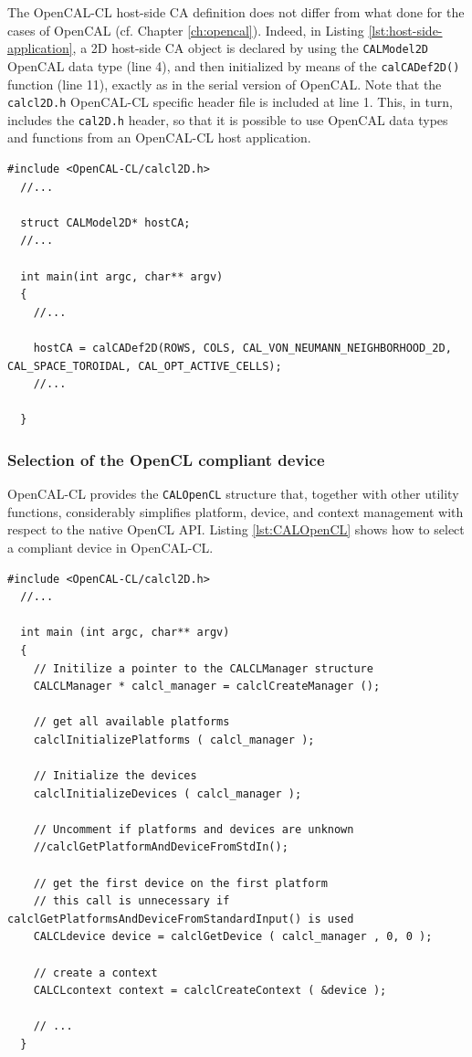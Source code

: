 The OpenCAL-CL host-side CA definition does not differ from what done
for the cases of OpenCAL (cf. Chapter \ref{ch:opencal}). Indeed, in
Listing \ref{lst:host-side-application}, a 2D host-side CA object is
declared by using the \verb'CALModel2D' OpenCAL data type (line 4),
and then initialized by means of the \verb'calCADef2D()' function
(line 11), exactly as in the serial version of OpenCAL. Note that the
\verb'calcl2D.h' OpenCAL-CL specific header file is included at line
1. This, in turn, includes the \verb'cal2D.h' header, so that it is
possible to use OpenCAL data types and functions from an OpenCAL-CL
host application.

\begin{lstlisting}[float,floatplacement=H, label=lst:host-side-application, caption={An example of OpenCAL-CL host-side application.}]
  #include <OpenCAL-CL/calcl2D.h>
  //...

  struct CALModel2D* hostCA;
  //...

  int main(int argc, char** argv)
  {
    //...

    hostCA = calCADef2D(ROWS, COLS, CAL_VON_NEUMANN_NEIGHBORHOOD_2D, CAL_SPACE_TOROIDAL, CAL_OPT_ACTIVE_CELLS);
    //...

  }
\end{lstlisting}


\subsubsection{Selection of the OpenCL compliant device}

OpenCAL-CL provides the \verb'CALOpenCL' structure that, together with
other utility functions, considerably simplifies platform, device, and
context management with respect to the native OpenCL API. Listing
\ref{lst:CALOpenCL} shows how to select a compliant device in
OpenCAL-CL.

\begin{lstlisting}[float,floatplacement=H, label=lst:CALOpenCL, caption=Access to platform and devices.]
  #include <OpenCAL-CL/calcl2D.h>
  //...

  int main (int argc, char** argv)
  {
    // Initilize a pointer to the CALCLManager structure
    CALCLManager * calcl_manager = calclCreateManager ();

    // get all available platforms
    calclInitializePlatforms ( calcl_manager );

    // Initialize the devices
    calclInitializeDevices ( calcl_manager );

    // Uncomment if platforms and devices are unknown
    //calclGetPlatformAndDeviceFromStdIn();

    // get the first device on the first platform
    // this call is unnecessary if calclGetPlatformsAndDeviceFromStandardInput() is used
    CALCLdevice device = calclGetDevice ( calcl_manager , 0, 0 );

    // create a context
    CALCLcontext context = calclCreateContext ( &device );

    // ...
  }
\end{lstlisting}

